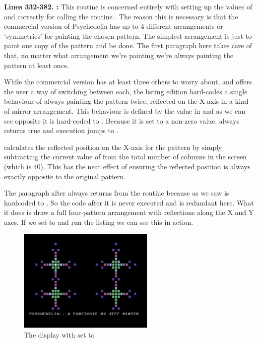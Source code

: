 \textbf{Lines 332-382. :} This routine is concerned entirely with setting up the values of  and  correctly
for calling the routine . The reason this is necessary is that the commercial version of Psychedelia
has up to 4 different arrangements or 'symmetries' for painting the chosen pattern. The simplest arrangement is just to 
paint one copy of the pattern and be done. The first paragraph here takes care of that, no matter what arrangement we're
painting we're always painting the pattern at least once. 

While the commercial version has at least three others to worry about, and offers the user a way of switching between each,
the listing edition hard-codes a single behaviour of always painting the pattern twice, reflected on the X-axis in a kind of mirror
arrangement. This behaviour is defined by the value in  and as we can see opposite it
is hard-coded to . Because it is set to a non-zero value,  always returns true and execution
jumps to .

 calculates the reflected position on the X-axis for the pattern by simply subtracting the current value
of  from the total number of columns in the screen (which is 40). This has the neat effect of ensuring
the reflected position is always exactly opposite to the original pattern.

The paragraph after  always returns from the routine because as we saw  is
hardcoded to . So the code after it is never executed and is redundant here. What it does is draw a full four-pattern
arrangement with reflections along the X and Y axes. If we set  to  and run the
listing we can see this in action.


\begin{figure}[H]
    \centering
      \includegraphics[height=5cm]{src/listing_commentary/four_pattern.png}
  \caption*{The display with  set to }
\end{figure}


